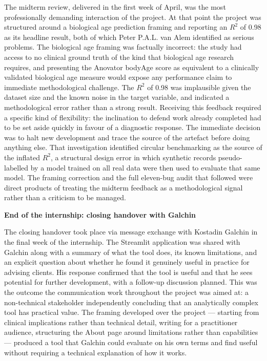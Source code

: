 \documentclass[11pt,a4paper]{report}
\begin{document}
The midterm review, delivered in the first week of April, was the most professionally demanding
interaction of the project. At that point the project was structured around a biological age
prediction framing and reporting an $R^2$ of 0.98 as its headline result, both of which Peter P.A.L. van Alem
identified as serious problems. The biological age framing was factually incorrect: the study had
access to no clinical ground truth of the kind that biological age research requires, and presenting
the Anovator bodyAge score as equivalent to a clinically validated biological age measure would
expose any performance claim to immediate methodological challenge. The $R^2$ of 0.98 was
implausible given the dataset size and the known noise in the target variable, and indicated a
methodological error rather than a strong result. Receiving this feedback required a specific kind
of flexibility: the inclination to defend work already completed had to be set aside quickly in
favour of a diagnostic response. The immediate decision was to halt new development and trace the
source of the artefact before doing anything else. That investigation identified circular
benchmarking as the source of the inflated $R^2$, a structural design error in which synthetic
records pseudo-labelled by a model trained on all real data were then used to evaluate that same
model. The framing correction and the full eleven-bug audit that followed were direct products of
treating the midterm feedback as a methodological signal rather than a criticism to be managed.

\textbf{End of the internship: closing handover with Galchin}

The closing handover took place via message exchange with Kostadin Galchin in the final week of
the internship. The Streamlit application was shared with Galchin along with a summary of what the
tool does, its known limitations, and an explicit question about whether he found it genuinely
useful in practice for advising clients. His response confirmed that the tool is useful and that he
sees potential for further development, with a follow-up discussion planned. This was the outcome
the communication work throughout the project was aimed at: a non-technical stakeholder
independently concluding that an analytically complex tool has practical value. The framing
developed over the project --- starting from clinical implications rather than technical detail,
writing for a practitioner audience, structuring the About page around limitations rather than
capabilities --- produced a tool that Galchin could evaluate on his own terms and find useful
without requiring a technical explanation of how it works.
\end{document}
